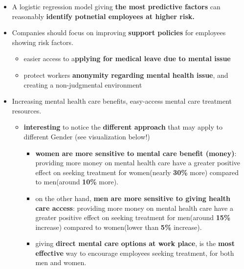 \documentclass[
]{article}
\providecommand{\tightlist}{%
  \setlength{\itemsep}{0pt}\setlength{\parskip}{0pt}}
\begin{document}
\begin{itemize}
\tightlist
\item
  A logistic regression model giving \textbf{the most predictive
  factors} can reasonably \textbf{identify potnetial employees at higher
  risk.}
\item
  Companies should focus on improving \textbf{support policies} for
  employees showing risk factors.

  \begin{itemize}
  \tightlist
  \item
    easier access to a\textbf{pplying for medical leave due to mental
    issue}
  \item
    protect workers \textbf{anonymity regarding mental health issue},
    and creating a non-judgmental environment
  \end{itemize}
\item
  Increasing mental health care benefits, easy-access mental care
  treatment resources.

  \begin{itemize}
  \tightlist
  \item
    \textbf{interesting} to notice the \textbf{different approach} that
    may apply to different Gender (see visualization below!)

    \begin{itemize}
    \tightlist
    \item
      \textbf{women are more sensitive to mental care benefit (money)}:
      providing more money on mental health care have a greater positive
      effect on seeking treatment for women(nearly \textbf{30\%} more)
      compared to men(around \textbf{10\%} more).
    \item
      on the other hand, \textbf{men are more sensitive to giving health
      care access}: providing more money on mental health care have a
      greater positive effect on seeking treatment for men(around
      \textbf{15\%} increase) compared to women(lower than \textbf{5\%}
      increase).
    \item
      giving \textbf{direct mental care options at work place}, is the
      \textbf{most effective} way to encourage employees seeking
      treatment, for both men and women.
    \end{itemize}
  \end{itemize}
\end{itemize}
\end{document}
